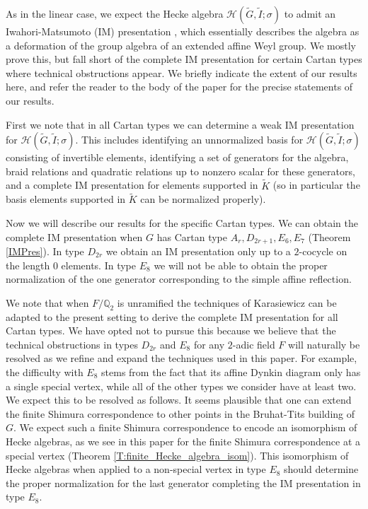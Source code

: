 \documentclass[10pt, letterpaper]{amsart}
\theoremstyle{plain}
\theoremstyle{definition}
\numberwithin{equation}{section}
\newcommand{\Gt}{\widetilde{G}}
\newcommand{\It}{\widetilde{I}}
\newcommand{\Kt}{\widetilde{K}}
\newcommand{\Hcal}{\mathcal{H}}
\begin{document}
As in the linear case, we expect the Hecke algebra $\Hcal(\Gt, \It; \sigma)$ to admit an Iwahori-Matsumoto (IM) presentation \cite{IM}, which essentially describes the algebra as a deformation of the group algebra of an extended affine Weyl group. We mostly prove this, but fall short of the complete IM presentation for certain Cartan types where technical obstructions appear. We briefly indicate the extent of our results here, and refer the reader to the body of the paper for the precise statements of our results. 

First we note that in all Cartan types we can determine a weak IM presentation for $\Hcal(\Gt, \It; \sigma)$. This includes identifying an unnormalized basis for $\Hcal(\Gt, \It; \sigma)$ consisting of invertible elements, identifying a set of generators for the algebra, braid relations and quadratic relations up to nonzero scalar for these generators, and a complete IM presentation for elements supported in $\Kt$ (so in particular the basis elements supported in $\Kt$ can be normalized properly). 

Now we will describe our results for the specific Cartan types. We can obtain the complete IM presentation when $G$ has Cartan type $A_r,D_{2r+1},E_{6},E_{7}$ (Theorem \ref{IMPres}). In type $D_{2r}$ we obtain an IM presentation only up to a $2$-cocycle on the length $0$ elements. In type $E_{8}$ we will not be able to obtain the proper normalization of the one generator corresponding to the simple affine reflection.

We note that when $F/\mathbb{Q}_{2}$ is unramified the techniques of Karasiewicz \cite{Karasiewicz} can be adapted to the present setting to derive the complete IM presentation for all Cartan types. We have opted not to pursue this because we believe that the technical obstructions in types $D_{2r}$ and $E_{8}$ for any $2$-adic field $F$ will naturally be resolved as we refine and expand the techniques used in this paper. For example, the difficulty with $E_{8}$ stems from the fact that its affine Dynkin diagram only has a single special vertex, while all of the other types we consider have at least two. We expect this to be resolved as follows. It seems plausible that one can extend the finite Shimura correspondence to other points in the Bruhat-Tits building of $G$. We expect such a finite Shimura correspondence to encode an isomorphism of Hecke algebras, as we see in this paper for the finite Shimura correspondence at a special vertex (Theorem \ref{T:finite_Hecke_algebra_isom}). This isomorphism of Hecke algebras when applied to a non-special vertex in type $E_{8}$ should determine the proper normalization for the last generator completing the IM presentation in type $E_{8}$.
\end{document}

